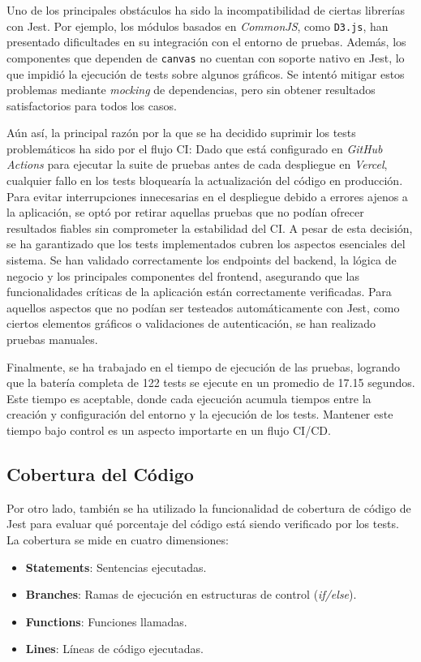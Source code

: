 Uno de los principales obstáculos ha sido la incompatibilidad de ciertas librerías con Jest. Por ejemplo, los módulos basados en \textit{CommonJS}, como \texttt{D3.js}, han presentado dificultades en su integración con el entorno de pruebas. Además, los componentes que dependen de \texttt{canvas} no cuentan con soporte nativo en Jest, lo que impidió la ejecución de tests sobre algunos gráficos. Se intentó mitigar estos problemas mediante \textit{mocking} de dependencias, pero sin obtener resultados satisfactorios para todos los casos.

Aún así, la principal razón por la que se ha decidido suprimir los tests problemáticos ha sido por el flujo CI: Dado que está configurado en \textit{GitHub Actions} para ejecutar la suite de pruebas antes de cada despliegue en \textit{Vercel}, cualquier fallo en los tests bloquearía la actualización del código en producción. Para evitar interrupciones innecesarias en el despliegue debido a errores ajenos a la aplicación, se optó por retirar aquellas pruebas que no podían ofrecer resultados fiables sin comprometer la estabilidad del CI. A pesar de esta decisión, se ha garantizado que los tests implementados cubren los aspectos esenciales del sistema. Se han validado correctamente los endpoints del backend, la lógica de negocio y los principales componentes del frontend, asegurando que las funcionalidades críticas de la aplicación están correctamente verificadas. Para aquellos aspectos que no podían ser testeados automáticamente con Jest, como ciertos elementos gráficos o validaciones de autenticación, se han realizado pruebas manuales.

Finalmente, se ha trabajado en el tiempo de ejecución de las pruebas, logrando que la batería completa de 122 tests se ejecute en un promedio de 17.15 segundos. Este tiempo es aceptable, donde cada ejecución acumula tiempos entre la creación y configuración del entorno y la ejecución de los tests. Mantener este tiempo bajo control es un aspecto importarte en un flujo CI/CD.

\subsection{Cobertura del Código}

Por otro lado, también se ha utilizado la funcionalidad de cobertura de código de Jest para evaluar qué porcentaje del código está siendo verificado por los tests. La cobertura se mide en cuatro dimensiones:

\begin{itemize}
    \item \textbf{Statements}: Sentencias ejecutadas. \vspace{-5pt}
    \item \textbf{Branches}: Ramas de ejecución en estructuras de control (\textit{if/else}). \vspace{-5pt}
    \item \textbf{Functions}: Funciones llamadas. \vspace{-5pt}
    \item \textbf{Lines}: Líneas de código ejecutadas.
\end{itemize}

